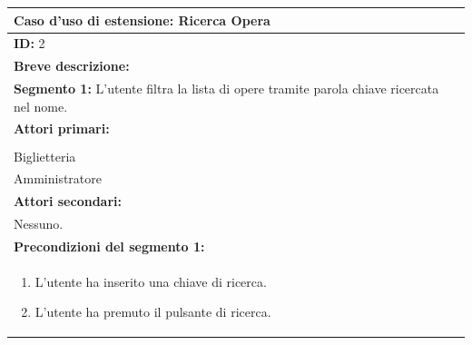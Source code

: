 \documentclass{article}
\begin{document}
                \begin{table}[H]
                    \begin{tabular}{|p{\linewidth}|}
                        \hline
                        \cellcolor{gray!100}
                        \color{white}
                        \centerline{\textbf{Caso d'uso di estensione:} Ricerca Opera} \\
                        \hline
                        \textbf{ID:} 2 \\
                        \hline
                        \cellcolor{gray!20}
                        \textbf{Breve descrizione:} \\
                        \cellcolor{gray!20}
                        \textbf{Segmento 1:} L'utente filtra la lista di opere tramite parola chiave ricercata nel nome. \\
                        \hline
                        \textbf{Attori primari:} \\
                        \begin{minipage}{\linewidth}
                            Cliente \\
                            Biglietteria \\
                            Amministratore
                        \end{minipage}
                        \vspace{0pt} \\  %
                        \hline
                        \textbf{Attori secondari:} \\
                        Nessuno. \\
                        \hline
                        \cellcolor{gray!20}
                        \textbf{Precondizioni del segmento 1:} \\
                        \cellcolor{gray!20}
                        \begin{minipage}{\linewidth}
                            \begin{enumerate}
                                \item L'utente ha inserito una chiave di ricerca.
                                \item L'utente ha premuto il pulsante di ricerca.
                            \end{enumerate}

\end{minipage}
\end{tabular}
\end{table}
\end{document}

